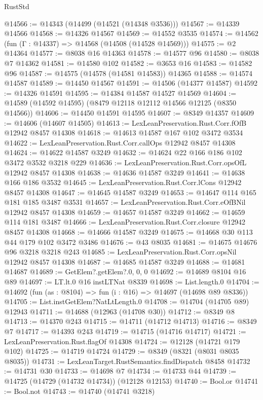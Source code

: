 \begin{lexlean}{RustStd}
\begin{coremodule}
@14566 := @14343 (@14499 (@14521 (@14348 @3536)))
@14567 := @14339 @14566
@14568 := @14326 @14567
@14569 := @14552 @3535
@14574 := @14562 (fun (Γ : @14337) => @14568 (@14508 (@14528 @14569)))
@14575 := @2 @14364
@14577 := @8038 @16 @14363
@14578 := @14577 @96
@14580 := @8038 @7 @14362
@14581 := @14580 @102
@14582 := @3653 @16
@14583 := @14582 @96
@14587 := @14575 (@14578 (@14581 @14583)) @14365
@14588 := @14574 @14587
@14589 := @14450 @14567
@14591 := @14506 (@14377 @14587)
@14592 := @14326 @14591
@14595 := @14384 @14587 @14527 @14569
@14604 := @14589 (@14592 @14595) (@8479 @12118 @12112 @14566 @12125 (@8350 @14566))
@14606 := @14450 @14591 @14595
@14607 := @8349 @14357
@14609 := @14606 (@14607 @14505)
@14613 := LexLeanPreservation.Rust.Corr.fOfB @12942 @8457 @14308
@14618 := @14613 @14587 @167 @102 @3472 @3534
@14622 := LexLeanPreservation.Rust.Corr.callOps @12942 @8457 @14308
@14624 := @14622 @14587 @3249
@14632 := @14624 @22 @166 @186 @102 @3472 @3532 @3218 @229
@14636 := LexLeanPreservation.Rust.Corr.opsOfL @12942 @8457 @14308
@14638 := @14636 @14587 @3249
@14641 := @14638 @166 @186 @3532
@14645 := LexLeanPreservation.Rust.Corr.lCons @12942 @8457 @14308
@14647 := @14645 @14587 @3249
@14653 := @14647 @114 @165 @181 @185 @3487 @3531
@14657 := LexLeanPreservation.Rust.Corr.eOfBNil @12942 @8457 @14308
@14659 := @14657 @14587 @3249
@14662 := @14659 @114 @181 @3487
@14666 := LexLeanPreservation.Rust.Corr.closure @12942 @8457 @14308
@14668 := @14666 @14587 @3249
@14675 := @14668 @30 @113 @44 @179 @102 @3472 @3486
@14676 := @43 @8035
@14681 := @14675 @14676 @96 @3218 @3218 @243
@14685 := LexLeanPreservation.Rust.Corr.opsNil @12942 @8457 @14308
@14687 := @14685 @14587 @3249
@14688 := @14681 @14687
@14689 := GetElem?.getElem?.{0, 0, 0}
@14692 := @14689 @8104 @16 @89
@14697 := LT.lt.{0} @16 instLTNat @8339
@14698 := List.length.{0}
@14704 := @14692 (fun (as : @8104) => fun (i : @16) => @14697 (@14698 @89 @8336))
@14705 := List.instGetElem?NatLtLength.{0}
@14708 := @14704 (@14705 @89) @12943
@14711 := @14688 (@12963 (@14708 @30))
@14712 := @8349 @8
@14713 := @14370 @243
@14715 := @14711 (@14712 @14713)
@14716 := @8349 @7
@14717 := @14393 @243
@14719 := @14715 (@14716 @14717)
@14721 := LexLeanPreservation.Rust.flagOf @14308
@14724 := @12128 (@14721 @179 @102)
@14725 := @14719 @14724
@14729 := @8349 (@8321 (@8031 @8035 @8035))
@14731 := LexLeanTarget.RustSemantics.findDispatch @8458
@14732 := @14731 @30
@14733 := @14698 @7
@14734 := @14733 @44
@14739 := @14725 (@14729 (@14732 @14734)) (@12128 @12153)
@14740 := Bool.or
@14741 := Bool.not
@14743 := @14740 (@14741 @3218)

\end{coremodule}
\end{lexlean}
